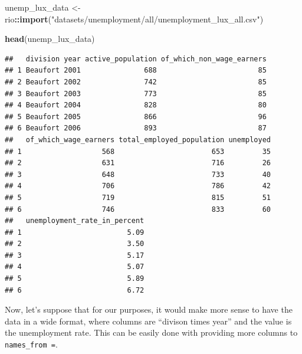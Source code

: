 \documentclass[]{gitbook}
\newenvironment{Shaded}{\begin{snugshade}}{\end{snugshade}}
\newcommand{\DataTypeTok}[1]{\textcolor[rgb]{0.13,0.29,0.53}{#1}}
\newcommand{\DecValTok}[1]{\textcolor[rgb]{0.00,0.00,0.81}{#1}}
\newcommand{\KeywordTok}[1]{\textcolor[rgb]{0.13,0.29,0.53}{\textbf{#1}}}
\newcommand{\NormalTok}[1]{#1}
\newcommand{\OperatorTok}[1]{\textcolor[rgb]{0.81,0.36,0.00}{\textbf{#1}}}
\newcommand{\StringTok}[1]{\textcolor[rgb]{0.31,0.60,0.02}{#1}}
\begin{document}
\begin{Shaded}
\begin{Highlighting}[]
\NormalTok{unemp_lux_data <-}\StringTok{ }\NormalTok{rio}\OperatorTok{::}\KeywordTok{import}\NormalTok{(}\StringTok{"datasets/unemployment/all/unemployment_lux_all.csv"}\NormalTok{)}

\KeywordTok{head}\NormalTok{(unemp_lux_data)}
\end{Highlighting}
\end{Shaded}

\begin{verbatim}
##   division year active_population of_which_non_wage_earners
## 1 Beaufort 2001               688                        85
## 2 Beaufort 2002               742                        85
## 3 Beaufort 2003               773                        85
## 4 Beaufort 2004               828                        80
## 5 Beaufort 2005               866                        96
## 6 Beaufort 2006               893                        87
##   of_which_wage_earners total_employed_population unemployed
## 1                   568                       653         35
## 2                   631                       716         26
## 3                   648                       733         40
## 4                   706                       786         42
## 5                   719                       815         51
## 6                   746                       833         60
##   unemployment_rate_in_percent
## 1                         5.09
## 2                         3.50
## 3                         5.17
## 4                         5.07
## 5                         5.89
## 6                         6.72
\end{verbatim}

Now, let's suppose that for our purposes, it would make more sense to have the data in a wide format,
where columns are ``divison times year'' and the value is the unemployment rate. This can be easily done
with providing more columns to \texttt{names\_from\ =}.

\begin{Shaded}
\end{Shaded}
\end{document}
